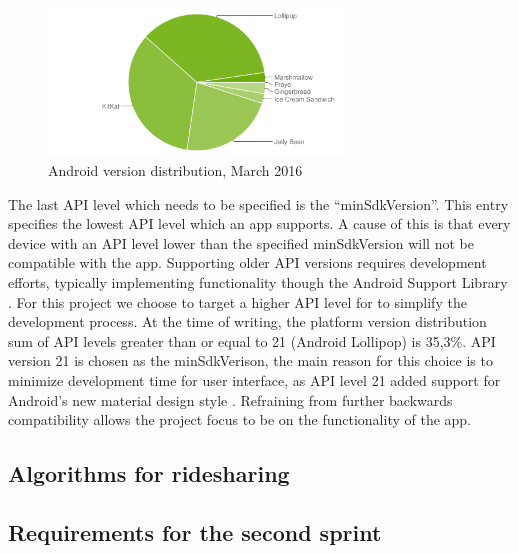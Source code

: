 \begin{figure}[h!]
	\centering
	\includegraphics[width=0.7\textwidth]{figures/android-chart-march.png}
	\caption{Android version distribution, March 2016 \cite{androidDashboard}}
	\label{fig:dashboard}
\end{figure}

The last API level which needs to be specified is the ``minSdkVersion''.
This entry specifies the lowest API level which an app supports.
A cause of this is that every device with an API level lower than the specified minSdkVersion will not be compatible with the app.
Supporting older API versions requires development efforts, typically implementing functionality though the Android Support Library \cite{androidSL}.
For this project we choose to target a higher API level for to simplify the development process.
At the time of writing, the platform version distribution sum of API levels greater than or equal to 21 (Android Lollipop) is 35,3\%.
API version 21 is chosen as the minSdkVerison, the main reason for this choice is to minimize development time for user interface, as API level 21 added support for Android's new material design style \cite{android5API}. Refraining from further backwards compatibility allows the project focus to be on the functionality of the app. 

\subsection{Algorithms for ridesharing}




\subsection{Requirements for the second sprint}
